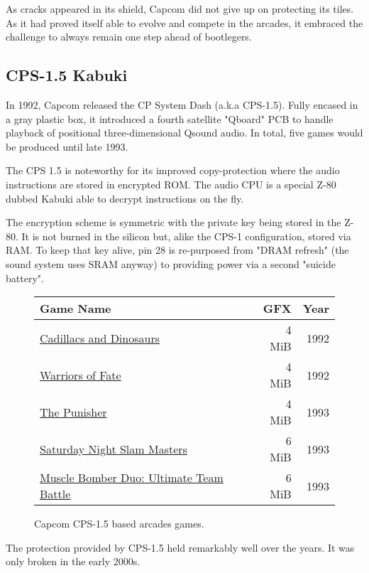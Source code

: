 As cracks appeared in its shield, Capcom did not give up on protecting its tiles. As it had proved itself able to evolve and compete in the arcades, it embraced the challenge to always remain one step ahead of bootlegers.

\subsection{CPS-1.5 Kabuki}
In 1992, Capcom released the CP System Dash (a.k.a CPS-1.5). Fully encased in a gray plastic box, it introduced a fourth satellite "Qboard" PCB to handle playback of positional three-dimensional Qsound audio. In total, five games would be produced until late 1993.



The CPS 1.5 is noteworthy for its improved copy-protection where the audio instructions are stored in encrypted ROM. The audio CPU is a special Z-80 dubbed Kabuki\cite{arcadeHackerKabuki} able to decrypt instructions on the fly.

The encryption scheme is symmetric with the private key being stored in the Z-80. It is not burned in the silicon but, alike the CPS-1 configuration, stored via RAM. To keep that key alive, pin 28 is re-purposed from "DRAM refresh" (the sound system uses SRAM anyway) to providing power via a second "suicide battery". 



\begin{figure}[H]
{ \setlength{\tabcolsep}{3.0pt}
\begin{tabularx}{\textwidth}{Xrr}
  \toprule    
  \textbf{Game Name} & \textbf{ GFX }  & \textbf{ Year } \\               
  \toprule    
\href{}{Cadillacs and Dinosaurs} & 4 MiB & 1992 \\ 
\href{}{Warriors of Fate} & 4 MiB & 1992 \\ 
\href{}{The Punisher} & 4 MiB & 1993 \\ 
\href{}{Saturday Night Slam Masters} & 6 MiB & 1993 \\ 
\href{}{Muscle Bomber Duo: Ultimate Team Battle} & 6 MiB & 1993 \\ 
  \toprule    
\end{tabularx}%
}\caption*{Capcom CPS-1.5 based arcades games.}
\end{figure}

\begin{trivia}
The protection provided by CPS-1.5 held remarkably well over the years. It was only broken in the early 2000s\cite{ame_kabuki}.
\end{trivia}

